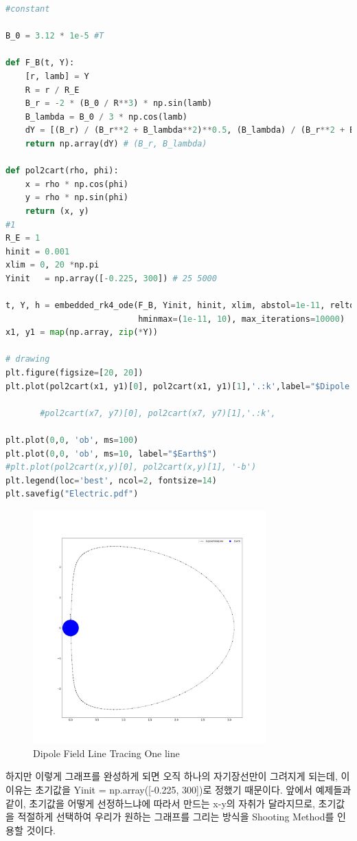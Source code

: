 \documentclass[11pt]{article}
\begin{document}
\begin{lstlisting}[language=Python]
#constant

B_0 = 3.12 * 1e-5 #T

def F_B(t, Y):
    [r, lamb] = Y
    R = r / R_E
    B_r = -2 * (B_0 / R**3) * np.sin(lamb)
    B_lambda = B_0 / 3 * np.cos(lamb)
    dY = [(B_r) / (B_r**2 + B_lambda**2)**0.5, (B_lambda) / (B_r**2 + B_lambda**2)**0.5]
    return np.array(dY) # (B_r, B_lambda)
    
def pol2cart(rho, phi):
    x = rho * np.cos(phi)
    y = rho * np.sin(phi)
    return (x, y)
#1
R_E = 1
hinit = 0.001
xlim = 0, 20 *np.pi
Yinit   = np.array([-0.225, 300]) # 25 5000

t, Y, h = embedded_rk4_ode(F_B, Yinit, hinit, xlim, abstol=1e-11, reltol=1e-11,
                           hminmax=(1e-11, 10), max_iterations=10000)
x1, y1 = map(np.array, zip(*Y))

# drawing
plt.figure(figsize=[20, 20])
plt.plot(pol2cart(x1, y1)[0], pol2cart(x1, y1)[1],'.:k',label="$Dipole Field Line$")

       #pol2cart(x7, y7)[0], pol2cart(x7, y7)[1],'.:k',

plt.plot(0,0, 'ob', ms=100)
plt.plot(0,0, 'ob', ms=10, label="$Earth$")
#plt.plot(pol2cart(x,y)[0], pol2cart(x,y)[1], '-b')
plt.legend(loc='best', ncol=2, fontsize=14)
plt.savefig("Electric.pdf")

\end{lstlisting}

\begin{figure}[!ht]
  \centering
  \includegraphics[width=0.8\textwidth]{Electric.pdf}
  \caption{Dipole Field Line Tracing One line}
\end{figure} 
하지만 이렇게 그래프를 완성하게 되면 오직 하나의 자기장선만이 그려지게 되는데, 이 이유는 초기값을 Yinit   = np.array([-0.225, 300])로 정했기 때문이다. 앞에서 예제들과 같이, 초기값을 어떻게 선정하느냐에 따라서 만드는 x-y의 자취가 달라지므로, 초기값을 적절하게 선택하여 우리가 원하는 그래프를 그리는 방식을 Shooting Method를 인용할 것이다.
\end{document}
